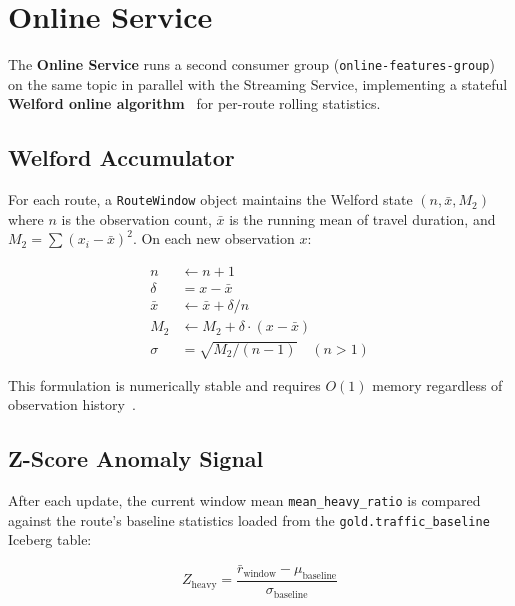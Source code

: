 \section{Online Service}
\label{sec:impl-online}

The \textbf{Online Service} runs a second consumer group
(\texttt{online-features-group}) on the same topic in parallel with the
Streaming Service, implementing a stateful \textbf{Welford online
algorithm}~\cite{welford1962} for per-route rolling statistics.

\subsection{Welford Accumulator}

For each route, a \texttt{RouteWindow} object maintains the Welford state
$(n, \bar{x}, M_2)$ where $n$ is the observation count, $\bar{x}$ is the
running mean of travel duration, and $M_2 = \sum(x_i - \bar{x})^2$.
On each new observation $x$:

\begin{align}
  n     &\leftarrow n + 1 \\
  \delta &= x - \bar{x} \\
  \bar{x} &\leftarrow \bar{x} + \delta / n \\
  M_2   &\leftarrow M_2 + \delta \cdot (x - \bar{x}) \\
  \sigma &= \sqrt{M_2 / (n - 1)} \quad (n > 1)
\end{align}

\noindent This formulation is numerically stable and requires $O(1)$ memory
regardless of observation history~\cite{welford1962}.

\subsection{Z-Score Anomaly Signal}

After each update, the current window mean \texttt{mean\_heavy\_ratio} is
compared against the route's baseline statistics loaded from the
\texttt{gold.traffic\_baseline} Iceberg table:

\begin{equation}
  Z_{\text{heavy}} = \frac{\bar{r}_\text{window} - \mu_\text{baseline}}
                          {\sigma_\text{baseline}}
\end{equation}

